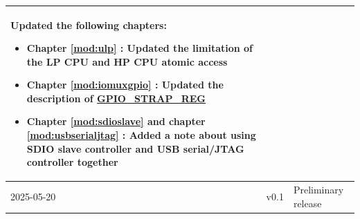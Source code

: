 \begin{longtable}[l]{ | m{2cm} | m{1.5cm} | m{12cm} | }
\begin{itemize}
    \end{itemize}
    Updated the following chapters:
    \begin{itemize}
        \item Chapter \ref{mod:ulp} \textit{\nameref{mod:ulp}}: Updated the limitation of the LP CPU and HP CPU atomic access %
        \item Chapter \ref{mod:iomuxgpio} \textit{\nameref{mod:iomuxgpio}}: Updated the description of \hyperref[fielddesc:GPIOSTRAPPING]{GPIO\_STRAP\_REG}
        \item Chapter \ref{mod:sdioslave} \textit{\nameref{mod:sdioslave}} and chapter \ref{mod:usbserialjtag} \textit{\nameref{mod:usbserialjtag}}: Added a note about using SDIO slave controller and USB serial/JTAG controller together %
    \end{itemize}
    \\\hline
    2025-05-20 & v0.1 & Preliminary release \\\hline
\end{longtable}

